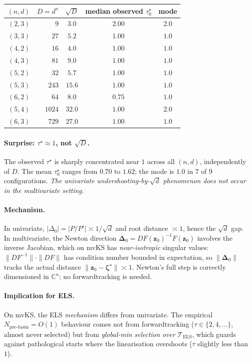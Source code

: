 \documentclass[11pt,a4paper]{article}
\begin{document}
\begin{center}
\begin{tabular}{rrccc}
\toprule
$(n, d)$ & $D = d^n$ & $\sqrt D$ & median observed $\tau^\star_0$ & mode \\
\midrule
$(2, 3)$ & $9$    & $3.0$  & $2.00$ & $2.0$ \\
$(3, 3)$ & $27$   & $5.2$  & $1.00$ & $1.0$ \\
$(4, 2)$ & $16$   & $4.0$  & $1.00$ & $1.0$ \\
$(4, 3)$ & $81$   & $9.0$  & $1.00$ & $1.0$ \\
$(5, 2)$ & $32$   & $5.7$  & $1.00$ & $1.0$ \\
$(5, 3)$ & $243$  & $15.6$ & $1.00$ & $1.0$ \\
$(6, 2)$ & $64$   & $8.0$  & $0.75$ & $1.0$ \\
$(5, 4)$ & $1024$ & $32.0$ & $1.00$ & $2.0$ \\
$(6, 3)$ & $729$  & $27.0$ & $1.00$ & $1.0$ \\
\bottomrule
\end{tabular}
\end{center}

\paragraph{Surprise: $\tau^\star \approx 1$, not $\sqrt D$.}
The observed $\tau^\star$ is sharply concentrated near $1$ across all $(n, d)$, independently of $D$. The mean $\tau^\star_0$ ranges from $0.70$ to $1.62$; the mode is $1.0$ in $7$ of $9$ configurations. \emph{The univariate undershooting-by-$\sqrt d$ phenomenon does not occur in the multivariate setting.}

\paragraph{Mechanism.}
In univariate, $|\Delta_0| = |P/P'| \asymp 1/\sqrt d$ and root distance $\asymp 1$, hence the $\sqrt d$ gap. In multivariate, the Newton direction $\boldsymbol{\Delta}_0 = DF(\mathbf z_0)^{-1} F(\mathbf z_0)$ involves the inverse Jacobian, which on mvKS has \emph{near-isotropic} singular values: $\|DF^{-1}\| \cdot \|DF\|$ has condition number bounded in expectation, so $\|\boldsymbol{\Delta}_0\|$ tracks the actual distance $\|\mathbf z_0 - \boldsymbol\zeta^\star\| \asymp 1$. Newton's full step is correctly dimensioned in $\mathbb{C}^n$; no forwardtracking is needed.

\paragraph{Implication for ELS.}
On mvKS, the ELS \emph{mechanism} differs from univariate. The empirical $N_{\text{pre-basin}} = O(1)$ behaviour comes not from forwardtracking ($\tau \in \{2, 4, \dots\}$, almost never selected) but from \emph{global-min selection over $\mathcal T_{\text{ELS}}$}, which guards against pathological starts where the linearisation overshoots ($\tau$ slightly less than $1$).
\end{document}
